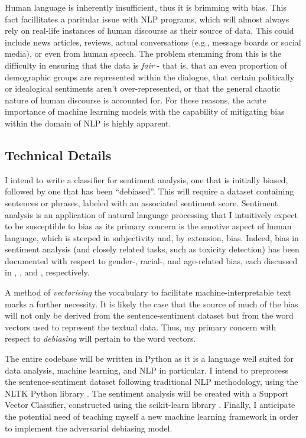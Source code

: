 \documentclass[a4paper]{IEEEtran}
\begin{document}
Human language is inherently insufficient, thus it is brimming with bias. This fact facillitates a paritular issue with NLP programs, which will almost always rely on real-life instances of human discourse as their source of data. This could include news articles, reviews, actual conversations (e.g., message boards or social media), or even from human speech. The problem stemming from this is the difficulty in ensuring that the data is \textit{fair} - that is, that an even proportion of demographic groups are represented within the dialogue, that certain politically or idealogical sentiments aren't over-represented, or that the general chaotic nature of human discourse is accounted for. For these reasons, the acute importance of machine learning models with the capability of mitigating bias within the domain of NLP is highly apparent.

\subsection{Technical Details}

I intend to write a classifier for sentiment analysis, one that is initially biased, followed by one that has been ``debiased''. This will require a dataset containing sentences or phrases, labeled with an associated sentiment score.  Sentiment analysis is an application of natural language processing that I intuitively expect to be susceptible to bias as its primary concern is the emotive aspect of human language, which is steeped in subjectivity and, by extension, bias. Indeed, bias in sentiment analysis (and closely related tasks, such as toxicity detection) has been documented with respect to gender-, racial-, and age-related bias, each discussed in \cite{b1}, \cite{b2}, and \cite{b3}, respectively. 

A method of \textit{vectorising} the vocabulary to facilitate machine-interpretable text marks a further necessity. It is likely the case that the source of much of the bias will not only be derived from the sentence-sentiment dataset but from the word vectors used to represent the textual data. Thus, my primary concern with respect to \textit{debiasing} will pertain to the word vectors. %

The entire codebase will be written in Python as it is a language well suited for data analysis, machine learning, and NLP in particular. I intend to preprocess the sentence-sentiment dataset following traditional NLP methodology, using the NLTK Python library \cite{nltk}. The sentiment analysis will be created with a Support Vector Classifier, constructed using the scikit-learn library \cite{sklearn}. Finally, I anticipate the potential need of teaching myself a new machine learning framework in order to implement the adversarial debiasing model.
\end{document}
